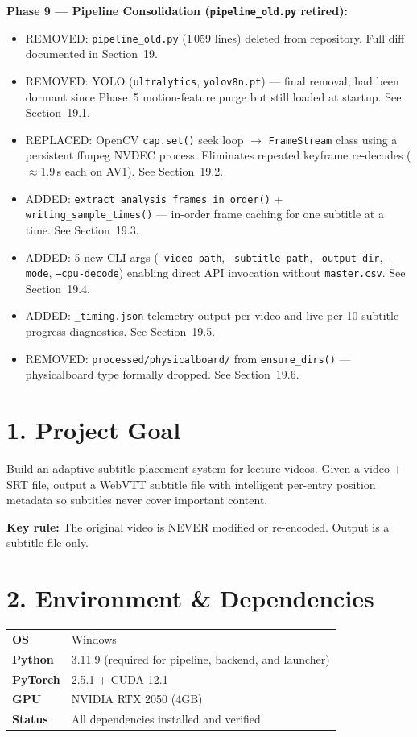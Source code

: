 \documentclass[11pt]{article}
\begin{document}
\textbf{Phase 9 --- Pipeline Consolidation (\texttt{pipeline\_old.py} retired):}
\begin{itemize}[leftmargin=1.2em]
    \item REMOVED: \texttt{pipeline\_old.py} (1\,059 lines) deleted from repository. Full diff documented in Section~19.
    \item REMOVED: YOLO (\texttt{ultralytics}, \texttt{yolov8n.pt}) --- final removal; had been dormant since Phase~5 motion-feature purge but still loaded at startup. See Section~19.1.
    \item REPLACED: OpenCV \texttt{cap.set()} seek loop $\rightarrow$ \texttt{FrameStream} class using a persistent ffmpeg NVDEC process. Eliminates repeated keyframe re-decodes ($\approx$1.9\,s each on AV1). See Section~19.2.
    \item ADDED: \texttt{extract\_analysis\_frames\_in\_order()} + \texttt{writing\_sample\_times()} --- in-order frame caching for one subtitle at a time. See Section~19.3.
    \item ADDED: 5 new CLI args (\texttt{--video-path}, \texttt{--subtitle-path}, \texttt{--output-dir}, \texttt{--mode}, \texttt{--cpu-decode}) enabling direct API invocation without \texttt{master.csv}. See Section~19.4.
    \item ADDED: \texttt{\_timing.json} telemetry output per video and live per-10-subtitle progress diagnostics. See Section~19.5.
    \item REMOVED: \texttt{processed/physicalboard/} from \texttt{ensure\_dirs()} --- physicalboard type formally dropped. See Section~19.6.
\end{itemize}

\section*{1. Project Goal}
Build an adaptive subtitle placement system for lecture videos. Given a video + SRT file, output a WebVTT subtitle file with intelligent per-entry position metadata so subtitles never cover important content.

\textbf{Key rule:} The original video is NEVER modified or re-encoded. Output is a subtitle file only.

\section*{2. Environment \& Dependencies}
\begin{tabularx}{\textwidth}{>{\bfseries}l X}
OS & Windows \\
Python & 3.11.9 (required for pipeline, backend, and launcher) \\
PyTorch & 2.5.1 + CUDA 12.1 \\
GPU & NVIDIA RTX 2050 (4GB) \\
Status & All dependencies installed and verified \\
\end{tabularx}
\end{document}
